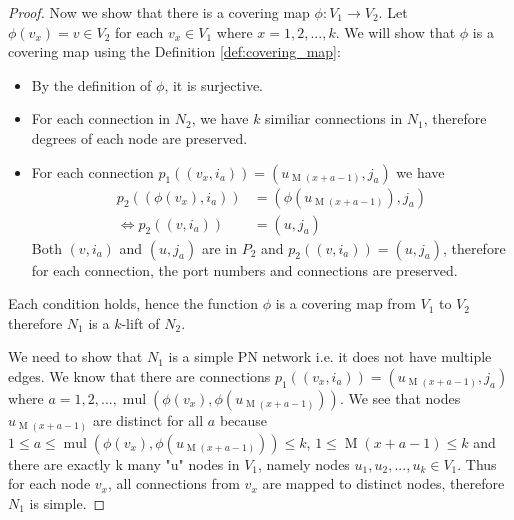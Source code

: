 \begin{proof}
    Now we show that there is a covering map $\phi: V_1 \rightarrow V_2$.
    Let $\phi(v_x) = v \in V_2$ for each $v_x \in V_1$ where $x=1, 2, ..., k$.
    We will show that $\phi$ is a covering map using the Definition \ref{def:covering_map}:
    \begin{itemize}
        \item By the definition of $\phi$, it is surjective.
        \item For each connection in $N_2$, we have $k$ similiar connections in $N_1$, therefore degrees of each node are preserved.
        \item For each connection $p_1((v_{x}, i_a)) = (u_{\operatorname{M}(x+a-1)}, j_a)$ we have
        \begin{align*}
           p_2((\phi(v_{x}), i_a)) &= (\phi(u_{\operatorname{M}(x+a-1)}), j_a)\\
           \Leftrightarrow p_2((v, i_a)) &= (u, j_a)
        \end{align*}
        Both $(v, i_a)$ and $(u, j_a)$ are in $P_2$ and $p_2((v, i_a)) = (u, j_a)$, therefore for each connection, the port numbers and connections are preserved.
    \end{itemize}
    Each condition holds, hence the function $\phi$ is a covering map from $V_1$ to $V_2$
    therefore $N_1$ is a $k$-lift of $N_2$.

    We need to show that $N_1$ is a simple PN network i.e. it does not have multiple edges.
    We know that there are connections $p_1((v_{x}, i_a)) = (u_{\operatorname{M}(x+a-1)}, j_a)$ where $a=1, 2, ..., \operatorname{mul}(\phi(v_{x}),\phi(u_{\operatorname{M}(x+a-1)}))$.
    We see that nodes $u_{\operatorname{M}(x+a-1)}$ are distinct for all $a$ because $1 \leq a \leq \operatorname{mul}(\phi(v_{x}),\phi(u_{\operatorname{M}(x+a-1)})) \leq k$, $1 \leq \operatorname{M}(x+a-1) \leq k$ and
    there are exactly k many "u" nodes in $V_1$, namely nodes $u_1, u_2, ..., u_k \in V_1$.
    Thus for each node $v_x$, all connections from $v_x$ are mapped to distinct nodes, therefore $N_1$ is simple.


\end{proof}
